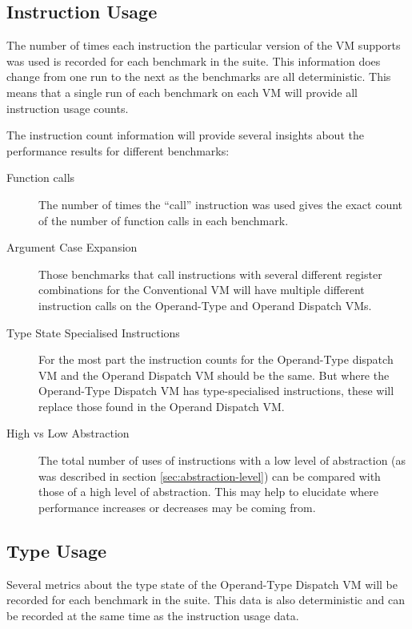 \documentclass[english,a4paper,12pt]{report}
\begin{document}
\subsection{Instruction Usage}

The number of times each instruction the particular version of the VM
supports was used is recorded for each benchmark in the
suite. This information does change from one run to the next as
the benchmarks are all deterministic. This means that a single run of
each benchmark on each VM will provide all instruction usage counts. 

The instruction count information will provide several insights about
the performance results for different benchmarks:
\begin{description}
\item[Function calls] The number of times the ``call'' instruction was
  used gives the exact count of the number of function calls in each
  benchmark.

\item[Argument Case Expansion] Those benchmarks that call instructions
  with several different register combinations for the Conventional VM
  will have multiple different instruction calls on the Operand-Type
  and Operand Dispatch VMs.

\item[Type State Specialised Instructions] For the most part the
  instruction counts for the Operand-Type dispatch VM and the Operand
  Dispatch VM should be the same. But where the Operand-Type Dispatch
  VM has type-specialised instructions, these will replace those found
  in the Operand Dispatch VM.

\item[High vs Low Abstraction] The total number of uses of
  instructions with a low level of abstraction (as was described in
  section \ref{sec:abstraction-level}) can be compared with those of a
  high level of abstraction. This may help to elucidate where
  performance increases or decreases may be coming from.
\end{description}

\subsection{Type Usage}

Several metrics about the type state of the Operand-Type Dispatch VM
will be recorded for each benchmark in the suite. This data is also
deterministic and can be recorded at the same time as the instruction
usage data. 
\end{document}
